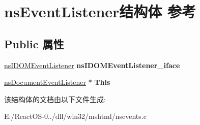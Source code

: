 \hypertarget{structns_event_listener}{}\section{ns\+Event\+Listener结构体 参考}
\label{structns_event_listener}
\subsection*{Public 属性}
\begin{DoxyCompactItemize}
\item 
\mbox{\label{structns_event_listener_a8b65d2d9529c54d97671eb2c2c325e8f}} 
\hyperlink{interfacens_i_d_o_m_event_listener}{ns\+I\+D\+O\+M\+Event\+Listener} {\bfseries ns\+I\+D\+O\+M\+Event\+Listener\+\_\+iface}
\item 
\mbox{\label{structns_event_listener_a9794e73ee75f08973c51b2338bbf15b3}} 
\hyperlink{structns_document_event_listener}{ns\+Document\+Event\+Listener} $\ast$ {\bfseries This}
\end{DoxyCompactItemize}


该结构体的文档由以下文件生成\+:\begin{DoxyCompactItemize}
\item 
E\+:/\+React\+O\+S-\/0../dll/win32/mshtml/nsevents.\+c\end{DoxyCompactItemize}
